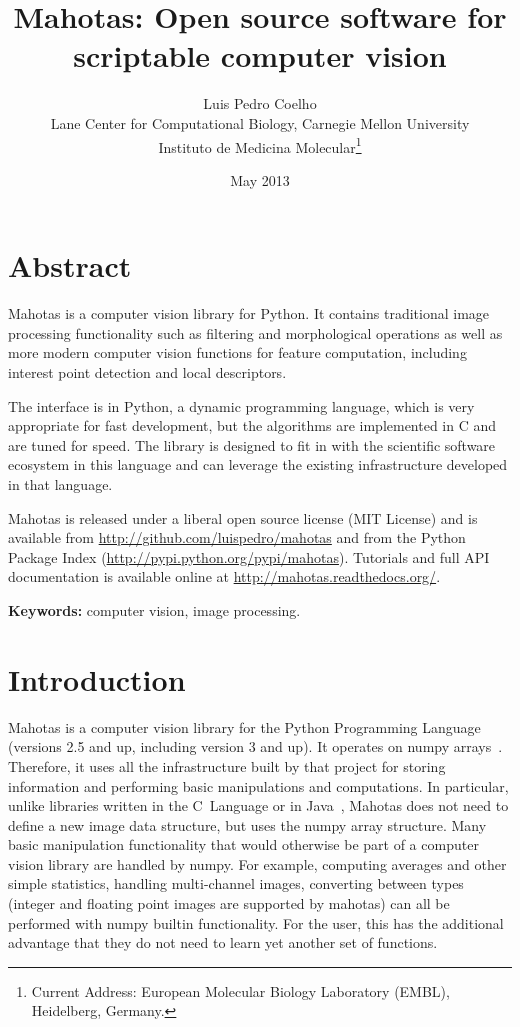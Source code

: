 \documentclass{scrartcl}
\title{Mahotas: Open source software for scriptable computer vision}
\author{Luis Pedro Coelho\\
Lane Center for Computational Biology, Carnegie Mellon University\\
Instituto de Medicina Molecular\footnote{Current Address: European Molecular
Biology Laboratory (EMBL), Heidelberg, Germany.}}
\date{May 2013}
\newcommand*{\cpp}{{C\nolinebreak[4]\hspace{-.05em}\raisebox{.4ex}{\tiny\textbf{++}}}}
\begin{document}
\maketitle

\section*{Abstract}
Mahotas is a computer vision library for Python. It contains traditional image
processing functionality such as filtering and morphological operations as well
as more modern computer vision functions for feature computation, including
interest point detection and local descriptors.

The interface is in Python, a dynamic programming language, which is very
appropriate for fast development, but the algorithms are implemented in \cpp{}
and are tuned for speed. The library is designed to fit in with the scientific
software ecosystem in this language and can leverage the existing
infrastructure developed in that language.

Mahotas is released under a liberal open source license (MIT License) and is
available from \url{http://github.com/luispedro/mahotas} and from the Python Package
Index (\url{http://pypi.python.org/pypi/mahotas}). Tutorials and full API
documentation is available online at \url{http://mahotas.readthedocs.org/}.

\textbf{Keywords:} computer vision, image processing.

\section{Introduction}

Mahotas is a computer vision library for the Python Programming Language
(versions 2.5 and up, including version 3 and up). It operates on numpy
arrays~\citep{numpystructure}. Therefore, it uses all the infrastructure built
by that project for storing information and performing basic manipulations and
computations. In particular, unlike libraries written in the C~Language or in
Java~\citep{Pietzsch15112012,Marcel:2010:TMP:1873951.1874254}, Mahotas does not need to define a
new image data structure, but uses the numpy array structure. Many basic
manipulation functionality that would otherwise be part of a computer vision
library are handled by numpy. For example, computing averages and other simple
statistics, handling multi-channel images, converting between types (integer
and floating point images are supported by mahotas) can all be performed with
numpy builtin functionality. For the user, this has the additional advantage
that they do not need to learn yet another set of functions.
\end{document}

